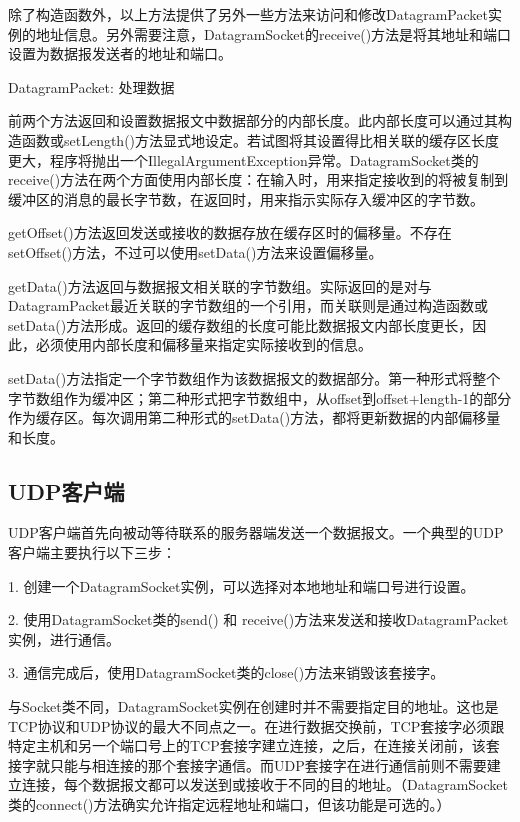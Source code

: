 		除了构造函数外，以上方法提供了另外一些方法来访问和修改DatagramPacket实例的地址信息。另外需要注意，DatagramSocket的receive()方法是将其地址和端口设置为数据报发送者的地址和端口。 

		DatagramPacket: 处理数据 

		

		前两个方法返回和设置数据报文中数据部分的内部长度。此内部长度可以通过其构造函数或setLength()方法显式地设定。若试图将其设置得比相关联的缓存区长度更大，程序将抛出一个IllegalArgumentException异常。DatagramSocket类的receive()方法在两个方面使用内部长度：在输入时，用来指定接收到的将被复制到缓冲区的消息的最长字节数，在返回时，用来指示实际存入缓冲区的字节数。 

		getOffset()方法返回发送或接收的数据存放在缓存区时的偏移量。不存在setOffset()方法，不过可以使用setData()方法来设置偏移量。 

		getData()方法返回与数据报文相关联的字节数组。实际返回的是对与DatagramPacket最近关联的字节数组的一个引用，而关联则是通过构造函数或setData()方法形成。返回的缓存数组的长度可能比数据报文内部长度更长，因此，必须使用内部长度和偏移量来指定实际接收到的信息。 

		setData()方法指定一个字节数组作为该数据报文的数据部分。第一种形式将整个字节数组作为缓冲区；第二种形式把字节数组中，从offset到offset+length-1的部分作为缓存区。每次调用第二种形式的setData()方法，都将更新数据的内部偏移量和长度。 

	\subsection{UDP客户端}

		UDP客户端首先向被动等待联系的服务器端发送一个数据报文。一个典型的UDP客户端主要执行以下三步： 

		1. 创建一个DatagramSocket实例，可以选择对本地地址和端口号进行设置。 

		2. 使用DatagramSocket类的send() 和 receive()方法来发送和接收DatagramPacket实例，进行通信。 

		3. 通信完成后，使用DatagramSocket类的close()方法来销毁该套接字。 

		与Socket类不同，DatagramSocket实例在创建时并不需要指定目的地址。这也是TCP协议和UDP协议的最大不同点之一。在进行数据交换前，TCP套接字必须跟特定主机和另一个端口号上的TCP套接字建立连接，之后，在连接关闭前，该套接字就只能与相连接的那个套接字通信。而UDP套接字在进行通信前则不需要建立连接，每个数据报文都可以发送到或接收于不同的目的地址。（DatagramSocket类的connect()方法确实允许指定远程地址和端口，但该功能是可选的。） 


